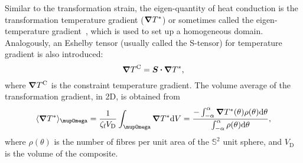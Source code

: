 	Similar to the transformation strain, the eigen-quantity of heat conduction is the transformation temperature gradient ($\grad{T}^*$) or sometimes called the eigen-temperature gradient~\autocite{Ghosh.2011}, which is used to set up a homogeneous domain. Analogously, an Eshelby tensor (usually called the S-tensor) for temperature gradient is also introduced:
	\begin{equation}
		\grad{T}^\text{C}=\tenb{S}\scp\grad{T}^*,
	\end{equation}
	where $\grad{T}^\text{C}$ is the constraint temperature gradient. The volume average of the transformation gradient, in 2D, is obtained from
	\begin{equation}
		\avevol{\grad{T}^*}_\mupOmega = \frac{1}{\zeta_{\text{f}}V_\text{D}}\int_{\mupOmega} \grad{T}^* \dif V = \frac{-\int_{-\alpha}^{\alpha} \grad{T}^*(\theta)\rho(\theta) \dif\theta}{\int_{-\alpha}^{\alpha} \rho(\theta) \dif\theta},
	\end{equation}
	where $\rho(\theta)$ is the number of fibres per unit area of the $\mathbb{S}^2$ unit sphere, and $V_\text{D}$ is the volume of the composite.
	
